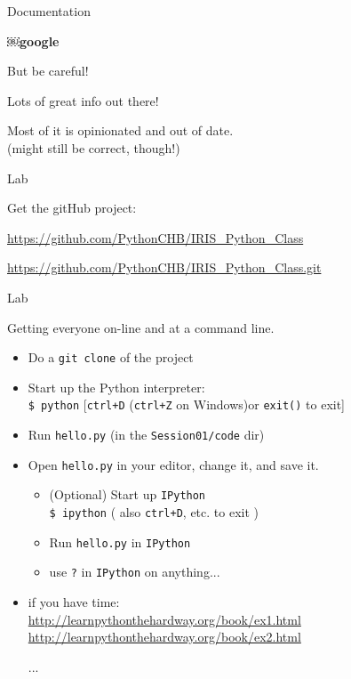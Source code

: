 \documentclass{beamer}
\begin{document}
\begin{frame}[fragile]{Documentation}

{\LARGE￼\bf google}

\vspace{0.25in}
But  be careful!

\vspace{0.25in}
Lots of great info out there!

\vspace{0.25in}
Most of it is opinionated and out of date.\\
(might still be correct, though!)

\end{frame} 


\begin{frame}[fragile]{Lab}

\vfill
Get the gitHub project:

\vfill
\url{https://github.com/PythonCHB/IRIS_Python_Class}

\vfill
{\small
\url{https://github.com/PythonCHB/IRIS_Python_Class.git}
}
\vfill

\end{frame} 


\begin{frame}[fragile]{Lab}

{\Large Getting everyone on-line and at a command line.}

\begin{itemize}
    \item Do a \verb+git clone+ of the project
    \item Start up the Python interpreter:\\
          \verb+$ python+ [\verb=ctrl+D= (\verb|ctrl+Z| on Windows)or \verb|exit()| to exit]
    \item Run \verb+hello.py+ (in the \verb+Session01/code+ dir)
    \item Open \verb|hello.py| in your editor, change it, and save it.
    \begin{itemize}    
        \item (Optional) Start up \verb+IPython+ \\
          \verb+$ ipython+ ( also \verb=ctrl+D=, etc. to exit )
         \item Run \verb+hello.py+ in \verb+IPython+
         \item use \verb+?+ in \verb+IPython+ on anything...
    \end{itemize}    
    \item if you have time:\\
\url{http://learnpythonthehardway.org/book/ex1.html}\\
\url{http://learnpythonthehardway.org/book/ex2.html}

...
    
\end{itemize}

\end{frame} 
\end{document}
